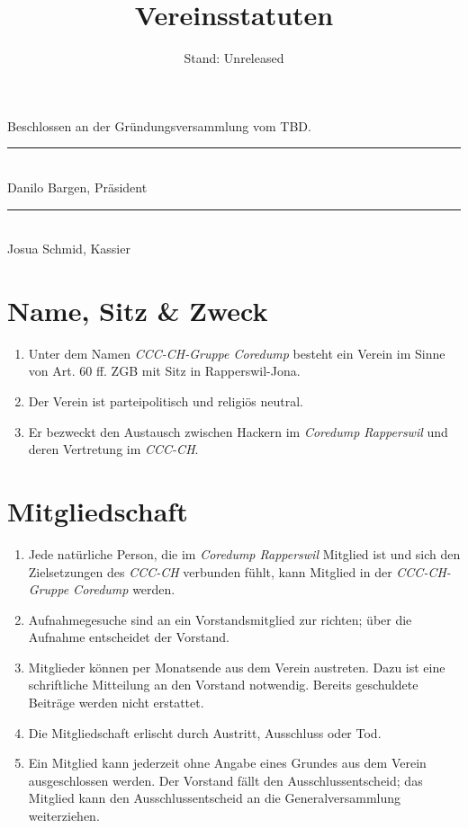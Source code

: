 \documentclass[10pt,a4paper,parskip,fleqn]{scrartcl}
\title{\Huge Vereinsstatuten}
\date{Stand: Unreleased}
\newcommand{\ol}{\begin{enumerate}[itemsep=-0.2em,topsep=-0.2em]}
\newcommand{\lo}{\end{enumerate}}
\newcommand{\li}{\item}
\newcommand{\name}{CCC-CH-Gruppe Coredump\xspace}
\newcommand{\iname}{\textit{\name}\xspace}
\newcommand{\parent}{Coredump Rapperswil\xspace}
\newcommand{\iparent}{\textit{\parent}\xspace}
\newcommand{\cccch}{CCC-CH\xspace}
\newcommand{\icccch}{\textit{\cccch}\xspace}
\begin{document}
\begin{titlepage}

	\maketitle
	\thispagestyle{empty} %

  \begin{center}

		\vspace{1cm}

		\theverbbox

		\vfill

		\large Beschlossen an der Gründungsversammlung vom TBD.

		\vspace{1.5cm}

		\begin{minipage}[t]{0.49\textwidth}
			\center
			\rule{5cm}{0.2mm}\\
			Danilo Bargen, Präsident
		\end{minipage}
		\begin{minipage}[t]{0.49\textwidth}
			\center
			\rule{5cm}{0.2mm}\\
			Josua Schmid, Kassier
		\end{minipage}

  \end{center}

\end{titlepage}


\section{Name, Sitz \& Zweck}

\ol
	\li Unter dem Namen \iname besteht ein Verein im Sinne von Art. 60
	ff. ZGB mit Sitz in Rapperswil-Jona.
	\li Der Verein ist parteipolitisch und religiös neutral.
	\li Er bezweckt den Austausch zwischen Hackern im \iparent und
	deren Vertretung im \icccch.
\lo


\section{Mitgliedschaft}

\ol
  \li Jede natürliche Person, die im \iparent Mitglied ist und sich den
	Zielsetzungen des \icccch verbunden fühlt, kann Mitglied in der \iname werden.
	\li Aufnahmegesuche sind an ein Vorstandsmitglied zur richten; über die
	Aufnahme entscheidet der Vorstand.
	\li Mitglieder können per Monatsende aus dem Verein austreten. Dazu ist eine
	schriftliche Mitteilung an den Vorstand notwendig. Bereits geschuldete
	Beiträge werden nicht erstattet.
	\li Die Mitgliedschaft erlischt durch Austritt, Ausschluss oder Tod.
	\li Ein Mitglied kann jederzeit ohne Angabe eines Grundes aus dem Verein
	ausgeschlossen werden. Der Vorstand fällt den Ausschlussentscheid; das
	Mitglied kann den Ausschlussentscheid an die Generalversammlung weiterziehen.
\lo
\end{document}
